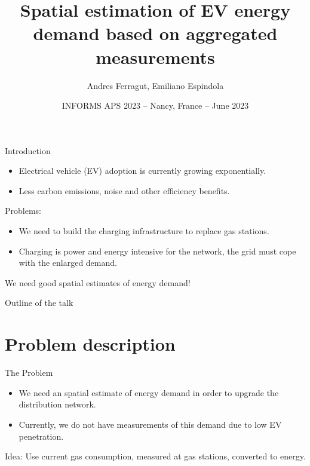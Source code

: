 \documentclass[aspectratio=169]{beamer}
\title{Spatial estimation of EV energy demand based on aggregated measurements}
\author[Andres Ferragut, Universidad ORT Uruguay]{\alert{Andres Ferragut}, Emiliano Espindola}
\institute{Universidad ORT Uruguay}
\date[INFORMS APS 2023]{INFORMS APS 2023 -- Nancy, France -- June 2023}
\begin{document}
\frame[plain]{\titlepage}

\begin{frame}{Introduction}

	\begin{itemize}
		\item Electrical vehicle (EV) adoption is currently growing exponentially.
		\item Less carbon emissions, noise and other efficiency benefits.
	\end{itemize}

	\vfill
	\alert{Problems:}
	\vfill
	\begin{itemize}
		\item We need to \alert{build the charging infrastructure} to replace gas stations.
		\item Charging is \alert{power and energy intensive} for the network, the grid must cope with the enlarged demand.
	\end{itemize}
	\vfill
	\pause
	
	\begin{center}
		\Large\alert{We need good spatial estimates of energy demand!}
	\end{center}
\end{frame}

\begin{frame}{Outline of the talk}
    \tableofcontents[hideallsubsections]
\end{frame}


\section{Problem description}

\begin{frame}{The Problem}

	\begin{itemize}
		\item We need an \alert{spatial estimate} of energy demand in order to upgrade the distribution network.
		\item Currently, we do not have \alert{measurements} of this demand due to low EV penetration.
	\end{itemize}

	\vfill

	\begin{block}{Idea:}
		Use current \alert{gas consumption}, measured at gas stations, converted to energy.
	\end{block}


\end{frame}
\end{document}
